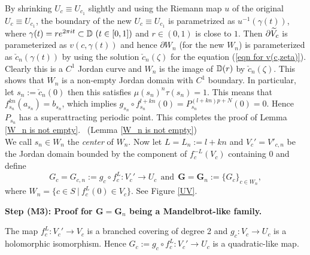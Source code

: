 \medskip

\noindent
By shrinking $U_c \equiv U_{c_1}$ slightly and using the Riemann map $u$ 
of the original $U_c \equiv U_{c_1}$, the boundary of the new 
$U_c \equiv U_{c_1}$ is parametrized as $u^{-1}(\gamma(t))$, where 
$\gamma(t) = re^{2\pi it} \subset \D \ (t \in [0,1])$ and $r \in (0,1)$ 
is close to $1$. Then 
$\partial \widetilde{V}_c$ is parameterized as $v(c, \gamma(t))$ and hence 
$\partial W_n$ (for the new $W_n$) is parameterized as 
$\check{c}_n(\gamma(t))$ by using the solution $\check{c}_n(\zeta)$ for 
the equation (\ref{eqn for v(c,zeta)}). Clearly this is a $C^1$ Jordan curve
and $W_n$ is the image of $\mathbb D(r)$ by $\check{c}_n(\zeta)$. This shows that 
$W_n$ is a non-empty Jordan domain with $C^1$ boundary. 
In particular, let $s_n := \check{c}_n(0)$ then this satisfies
$\mu(s_n)^n\tau(s_n) = 1$. This means that
$f_{s_n}^{kn}(a_{s_n}) = b_{s_n}$,
which implies $g_{s_n} \circ f_{s_n}^{l+kn}(0) = P_{s_n}^{(l+kn)p+N}(0)= 0$. 
Hence $P_{s_n}$ has a superattracting periodic point. 
This completes the proof of Lemma \ref{W_n is not empty}.
\QED ~{\small (Lemma \ref{W_n is not empty})}
\\

We call 
$s_n \in W_n$ the {\it center} of $W_n$. Now let $L = L_n := l+kn$ and
$V_c'=V'_{c,n}$ be the Jordan domain bounded by the component of $f_c^{-L}(V_c)$ 
containing $0$ and define
$$
  G_c = G_{c, n} := g_c \circ f_c^L : V_c' \to U_c
  \ \  \text{and} \ \ 
 \boldsymbol{G} = \boldsymbol{G}_n 
 := 
\{ G_c \}_{c \in W_n}, 
$$
where $W_n = \{ c \in S \ | \ f_c^L(0) \in V_c \}$.
See Figure \ref{UV}. 


\medskip

\noin
{\bf Step (M3): Proof for $\boldsymbol{G} = \boldsymbol{G}_n$ 
being a Mandelbrot-like family.} 


The map
$f_c^L : V_c' \to V_c$ is a branched covering of degree 2 and
$g_c : V_c \to U_c$ is a holomorphic isomorphism. Hence 
$G_c := g_c \circ f_c^L : V_c' \to U_c $ is a quadratic-like map.


